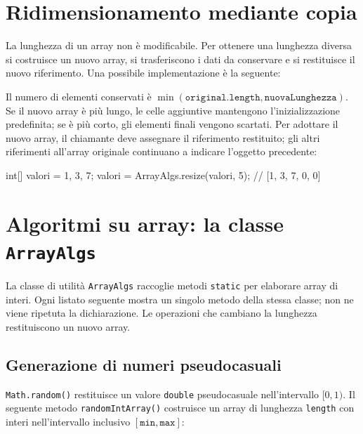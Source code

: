 \section{Ridimensionamento mediante copia}
\label{sec:fi-java-array-resize}

La lunghezza di un array non è modificabile. Per ottenere una
lunghezza diversa si costruisce un nuovo array, si trasferiscono
i dati da conservare e si restituisce il nuovo riferimento.
Una possibile implementazione è la seguente:



Il numero di elementi conservati è
\(\min(\texttt{original.length},\texttt{nuovaLunghezza})\).
Se il nuovo array è più lungo, le celle aggiuntive mantengono
l'inizializzazione predefinita; se è più corto, gli elementi
finali vengono scartati. Per adottare il nuovo array, il chiamante
deve assegnare il riferimento restituito; gli altri riferimenti
all'array originale continuano a indicare l'oggetto precedente:

\begin{unipdcode}[language=Java]
int[] valori = {1, 3, 7};
valori = ArrayAlgs.resize(valori, 5);  // [1, 3, 7, 0, 0]
\end{unipdcode}

\clearpage

\section{Algoritmi su array: la classe \texttt{ArrayAlgs}}
\label{sec:fi-java-array-algoritmi}

La classe di utilità \texttt{ArrayAlgs} raccoglie metodi
\texttt{static} per elaborare array di interi. Ogni listato seguente
mostra un singolo metodo della stessa classe; non ne viene
ripetuta la dichiarazione. Le operazioni che cambiano la lunghezza
restituiscono un nuovo array.

\subsection{Generazione di numeri pseudocasuali}
\label{sec:fi-java-array-casuale}

\texttt{Math.random()} restituisce un valore \texttt{double}
pseudocasuale nell'intervallo \([0,1)\). Il seguente metodo
\texttt{randomIntArray()} costruisce un array di lunghezza
\texttt{length} con interi nell'intervallo inclusivo
\([\texttt{min},\texttt{max}]\):

